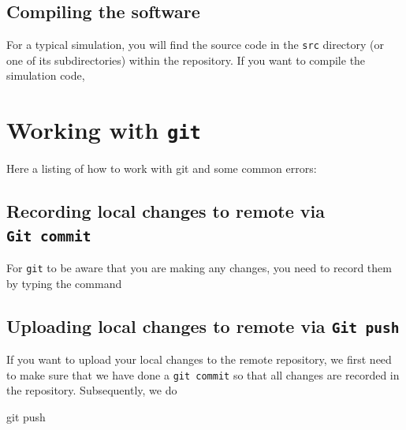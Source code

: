 \documentclass[
]{book}
\newenvironment{Shaded}{\begin{snugshade}}{\end{snugshade}}
\newcommand{\FunctionTok}[1]{\textcolor[rgb]{0.00,0.00,0.00}{#1}}
\newcommand{\NormalTok}[1]{#1}
\begin{document}
\hypertarget{compiling-the-software}{%
\section{Compiling the software}\label{compiling-the-software}}

For a typical simulation, you will find the source code in the \texttt{src} directory (or one of its subdirectories) within the repository. If you want to compile the simulation code,

\hypertarget{working-with-git}{%
\chapter{\texorpdfstring{Working with \texttt{git}}{Working with git}}\label{working-with-git}}

Here a listing of how to work with git and some common errors:

\hypertarget{recording-local-changes-to-remote-via-git-commit}{%
\section{\texorpdfstring{Recording local changes to remote via \texttt{Git\ commit}}{Recording local changes to remote via Git commit}}\label{recording-local-changes-to-remote-via-git-commit}}

For \texttt{git} to be aware that you are making any changes, you need to record them by typing the command

\begin{Shaded}
\begin{Highlighting}[]

\end{Highlighting}
\end{Shaded}

\hypertarget{uploading-local-changes-to-remote-via-git-push}{%
\section{\texorpdfstring{Uploading local changes to remote via \texttt{Git\ push}}{Uploading local changes to remote via Git push}}\label{uploading-local-changes-to-remote-via-git-push}}

If you want to upload your local changes to the remote repository, we first need to make sure that we have done a \texttt{git\ commit} so that all changes are recorded in the repository. Subsequently, we do

\begin{Shaded}
\begin{Highlighting}[]
\FunctionTok{git}\NormalTok{ push}
\end{Highlighting}
\end{Shaded}
\end{document}
